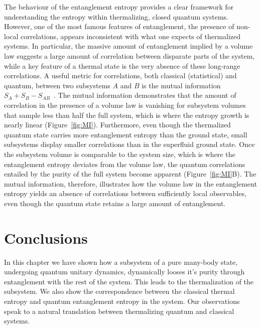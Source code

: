 The behaviour of the entanglement entropy provides a clear framework for understanding the entropy within thermalizing, closed quantum systems. However, one of the most famous features of entanglement, the presence of non-local correlations, appears inconsistent with what one expects of thermalized systems. In particular, the massive amount of entanglement implied by a volume law suggests a large amount of correlation between disparate parts of the system, while a key feature of a thermal state is the very absence of these long-range correlations. A useful metric for correlations, both classical (statistical) and quantum, between two subsystems $A$ and $B$ is the mutual information $S_A +S_B - S_{AB}$~\cite{Wolf2008, Islam2015}. The mutual information demonstrates that the amount of correlation in the presence of a volume law is vanishing for subsystem volumes that sample less than half the full system, which is where the entropy growth is nearly linear (Figure~\ref{fig:MI}). Furthermore, even though the thermalized quantum state carries more entanglement entropy than the ground state, small subsystems display smaller correlations than in the superfluid ground state. Once the subsystem volume is comparable to the system size, which is where the entanglement entropy deviates from the volume law, the quantum correlations entailed by the purity of the full system become apparent (Figure~\ref{fig:MI}B). The mutual information, therefore, illustrates how the volume law in the entanglement entropy yields an absence of correlations between sufficiently local observables, even though the quantum state retains a large amount of entanglement. 

\section{Conclusions}
In this chapter we have shown how a subsystem of a pure many-body state, undergoing quantum unitary dynamics, dynamically looses it's purity through entanglement with the rest of the system. This leads to the thermalization of the subsystem. We also show the correspondence between the classical thermal entropy and quantum entanglement entropy in the system. Our observations speak to a natural translation between thermalizing quantum and classical systems.


